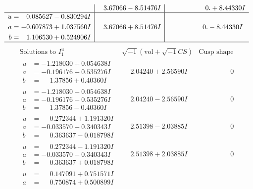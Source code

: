 \documentclass[1p]{elsarticle_modified}
\theoremstyle{definition}
\newcommand{\I}{\sqrt{-1}}
\begin{document}
$$\begin{array}{c|c|c}
 & \phantom{-}3.67066 - 8.51476 I & \phantom{-0.000000 -}0. + 8.44330 I \\ \hline\begin{aligned}
u &= \phantom{-}0.085627 - 0.830294 I \\
a &= -0.607873 + 1.037560 I \\
b &= \phantom{-}1.106530 + 0.524906 I\end{aligned}
 & \phantom{-}3.67066 + 8.51476 I & \phantom{-0.000000 } 0. - 8.44330 I\\
 \hline 
 \end{array}$$\newpage$$\begin{array}{c|c|c}  
\text{Solutions to }I^u_{1}& \I (\text{vol} + \sqrt{-1}CS) & \text{Cusp shape}\\
 \hline 
\begin{aligned}
u &= -1.218030 + 0.054638 I \\
a &= -0.196176 + 0.535276 I \\
b &= \phantom{-}1.37856 + 0.40360 I\end{aligned}
 & \phantom{-}2.04240 + 2.56590 I & \phantom{-0.000000 } 0 \\ \hline\begin{aligned}
u &= -1.218030 - 0.054638 I \\
a &= -0.196176 - 0.535276 I \\
b &= \phantom{-}1.37856 - 0.40360 I\end{aligned}
 & \phantom{-}2.04240 - 2.56590 I & \phantom{-0.000000 } 0 \\ \hline\begin{aligned}
u &= \phantom{-}0.272344 + 1.191320 I \\
a &= -0.033570 + 0.340343 I \\
b &= \phantom{-}0.363637 - 0.018798 I\end{aligned}
 & \phantom{-}2.51398 - 2.03885 I & \phantom{-0.000000 } 0 \\ \hline\begin{aligned}
u &= \phantom{-}0.272344 - 1.191320 I \\
a &= -0.033570 - 0.340343 I \\
b &= \phantom{-}0.363637 + 0.018798 I\end{aligned}
 & \phantom{-}2.51398 + 2.03885 I & \phantom{-0.000000 } 0 \\ \hline\begin{aligned}
u &= \phantom{-}0.147091 + 0.751571 I \\
a &= \phantom{-}0.750874 + 0.500899 I \\

\end{aligned}
\end{array}$$
\end{document}
